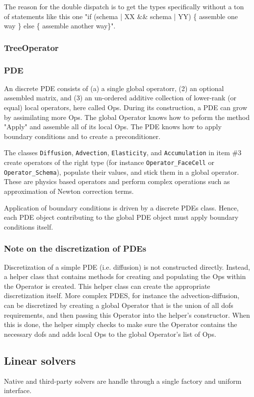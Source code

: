 The reason for the double dispatch is to get the types specifically
without a ton of statements like this one "if (schema | XX \&\& schema | YY) 
\{ assemble one way \} else \{ assemble another way\}".


\subsubsection{TreeOperator}


\subsubsection{PDE}
An discrete PDE consists of (a) a single global operatorr, (2) an 
optional assembled matrix, and (3) an un-ordered additive collection of 
lower-rank (or equal) local operators, here called Ops. 
During its construction, a PDE can grow by assimilating more Ops. 
The global Operator knows how to peform the method "Apply" and assemble 
all of its local Ops.
The PDE knows how to apply boundary conditions and to create a preconditioner.

The classes {\tt Diffusion}, {\tt Advection}, {\tt Elasticity},  
and {\tt Accumulation} in item \#3 create operators of the right type (for instance 
{\tt Operator\_FaceCell} or {\tt Operator\_Schema}), populate their values, and stick 
them in a global operator.
These are physics based operators and perform complex operations such as approximation
of Newton correction terms.

Application of boundary conditions is driven by a discrete PDEs class. 
Hence, each PDE object contributing to the global PDE object must apply
boundary conditions itself.


\subsubsection{Note on the discretization of PDEs}
Discretization of a simple 
PDE (i.e. diffusion) is not constructed directly. 
Instead, a helper class that contains methods for creating and populating 
the Ops within the Operator is created. This helper class can create the
appropriate discretization itself. More complex PDES, for instance the
advection-diffusion, can be discretized by creating a global Operator that 
is the union of all dofs requirements, and then passing this Operator
into the helper's constructor. When this is done, the helper simply 
checks to make sure the Operator contains the necessary dofs and
adds local Ops to the global Operator's list of Ops.


\subsection{Linear solvers}

Native and third-party solvers are handle through a single factory and 
uniform interface.



